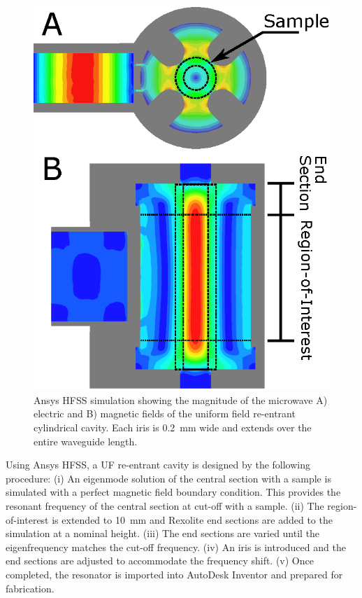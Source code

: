 \begin{figure}[htb]\centering
 \includegraphics{Kapitel/Ch2-Images/03-TE01UEMFields.eps}
 \caption[Simulation of the microwave fields.]{Ansys HFSS simulation showing the magnitude of the microwave A) electric and B) magnetic fields of the uniform field re-entrant cylindrical \cylTE{} cavity. Each iris is 0.2~mm wide and extends over the entire waveguide length.}
 \label{Ch2-fig:EMFields}
\end{figure}

Using Ansys HFSS, a UF re-entrant \cylTE{} cavity is designed by the following procedure: (i) An eigenmode solution of the central section with a sample is simulated with a perfect magnetic field boundary condition. This provides the resonant frequency of the central section at cut-off with a sample. (ii) The region-of-interest is extended to 10~mm and Rexolite end sections are added to the simulation at a nominal height. (iii) The end sections are varied until the eigenfrequency matches the cut-off frequency. (iv) An iris is introduced and the end sections are adjusted to accommodate the frequency shift. (v) Once completed, the resonator is imported into AutoDesk Inventor and prepared for fabrication. 

